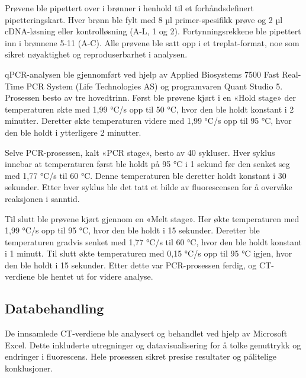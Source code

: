 \documentclass[
  letterpaper,
  DIV=11,
  numbers=noendperiod]{scrreprt}
\begin{document}
Prøvene ble pipettert over i brønner i henhold til et forhåndsdefinert
pipetteringskart. Hver brønn ble fylt med 8 µl primer-spesifikk prøve og
2 µl cDNA-løsning eller kontrolløsning (A-L, 1 og 2). Fortynningsrekkene
ble pipettert inn i brønnene 5-11 (A-C). Alle prøvene ble satt opp i et
treplat-format, noe som sikret nøyaktighet og reproduserbarhet i
analysen.

qPCR-analysen ble gjennomført ved hjelp av Applied Biosystems 7500 Fast
Real-Time PCR System (Life Technologies AS) og programvaren Quant Studio
5. Prosessen besto av tre hovedtrinn. Først ble prøvene kjørt i en «Hold
stage» der temperaturen økte med 1,99 °C/s opp til 50 °C, hvor den ble
holdt konstant i 2 minutter. Deretter økte temperaturen videre med 1,99
°C/s opp til 95 °C, hvor den ble holdt i ytterligere 2 minutter.

Selve PCR-prosessen, kalt «PCR stage», besto av 40 sykluser. Hver syklus
innebar at temperaturen først ble holdt på 95 °C i 1 sekund før den
senket seg med 1,77 °C/s til 60 °C. Denne temperaturen ble deretter
holdt konstant i 30 sekunder. Etter hver syklus ble det tatt et bilde av
fluorescensen for å overvåke reaksjonen i sanntid.

Til slutt ble prøvene kjørt gjennom en «Melt stage». Her økte
temperaturen med 1,99 °C/s opp til 95 °C, hvor den ble holdt i 15
sekunder. Deretter ble temperaturen gradvis senket med 1,77 °C/s til 60
°C, hvor den ble holdt konstant i 1 minutt. Til slutt økte temperaturen
med 0,15 °C/s opp til 95 °C igjen, hvor den ble holdt i 15 sekunder.
Etter dette var PCR-prosessen ferdig, og CT-verdiene ble hentet ut for
videre analyse.

\subsection{Databehandling}\label{databehandling}

De innsamlede CT-verdiene ble analysert og behandlet ved hjelp av
Microsoft Excel. Dette inkluderte utregninger og datavisualisering for å
tolke genuttrykk og endringer i fluorescens. Hele prosessen sikret
presise resultater og pålitelige konklusjoner.
\end{document}
